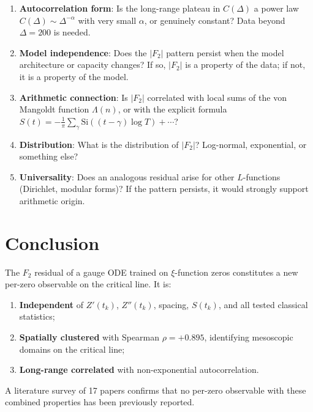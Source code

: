 \documentclass[11pt,a4paper]{article}
\newcommand{\Ftwo}{|F_2|}
\begin{document}
\begin{enumerate}
  \item \textbf{Autocorrelation form}: Is the long-range plateau in $C(\Delta)$
    a power law $C(\Delta) \sim \Delta^{-\alpha}$ with very small $\alpha$,
    or genuinely constant? Data beyond $\Delta = 200$ is needed.

  \item \textbf{Model independence}: Does the $\Ftwo$ pattern persist when
    the model architecture or capacity changes?
    If so, $\Ftwo$ is a property of the data; if not, it is a property of the model.

  \item \textbf{Arithmetic connection}: Is $\Ftwo$ correlated with local sums of
    the von Mangoldt function $\Lambda(n)$, or with the explicit formula
    $S(t) = -\frac{1}{\pi}\sum_{\gamma} \text{Si}((t-\gamma)\log T) + \cdots$?

  \item \textbf{Distribution}: What is the distribution of $\Ftwo$?
    Log-normal, exponential, or something else?

  \item \textbf{Universality}: Does an analogous residual arise for other
    $L$-functions (Dirichlet, modular forms)?
    If the pattern persists, it would strongly support arithmetic origin.
\end{enumerate}

\section{Conclusion}

The $F_2$ residual of a gauge ODE trained on $\xi$-function zeros constitutes
a new per-zero observable on the critical line.
It is:
\begin{enumerate}
  \item \textbf{Independent} of $Z'(t_k)$, $Z''(t_k)$, spacing, $S(t_k)$,
    and all tested classical statistics;
  \item \textbf{Spatially clustered} with Spearman $\rho = +0.895$,
    identifying mesoscopic domains on the critical line;
  \item \textbf{Long-range correlated} with non-exponential autocorrelation.
\end{enumerate}

A literature survey of 17 papers confirms that no per-zero observable
with these combined properties has been previously reported.
\end{document}
